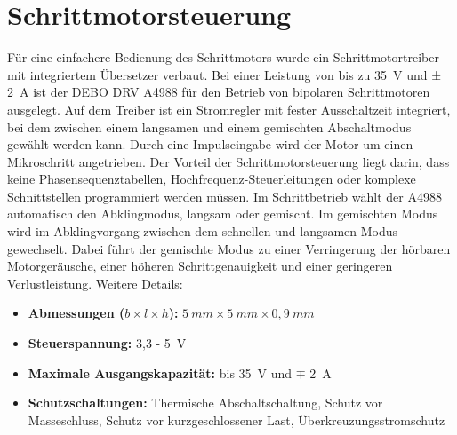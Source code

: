 \section{Schrittmotorsteuerung}	

Für eine einfachere Bedienung des Schrittmotors wurde ein Schrittmotortreiber mit integriertem Übersetzer verbaut. Bei einer Leistung von bis zu 35\ V und ± 2\ A ist der DEBO DRV A4988 für den Betrieb von bipolaren Schrittmotoren ausgelegt. Auf dem Treiber ist ein Stromregler mit fester Ausschaltzeit integriert, bei dem zwischen einem langsamen und einem gemischten Abschaltmodus gewählt werden kann. Durch eine Impulseingabe wird der Motor um einen Mikroschritt angetrieben. Der Vorteil der Schrittmotorsteuerung liegt darin, dass keine Phasensequenztabellen, Hochfrequenz-Steuerleitungen oder komplexe Schnittstellen programmiert werden müssen. Im Schrittbetrieb wählt der A4988 automatisch den Abklingmodus, langsam oder gemischt. Im gemischten Modus wird im Abklingvorgang zwischen dem schnellen und langsamen Modus gewechselt. Dabei führt der gemischte Modus zu einer Verringerung der hörbaren Motorgeräusche, einer höheren Schrittgenauigkeit und einer geringeren Verlustleistung.  
Weitere Details: \begin{itemize}
	\item \textbf{Abmessungen ($b \times l \times h$):} $5 \ mm \times 5 \ mm \times 0,9 \ mm$
	\item \textbf{Steuerspannung:} 3,3 - 5\ V
	\item \textbf{Maximale Ausgangskapazität:} bis 35\ V und $\mp$ 2\ A
	\item \textbf{Schutzschaltungen:}  Thermische Abschaltschaltung, Schutz vor Masseschluss, Schutz vor kurzgeschlossener Last, Überkreuzungsstromschutz
\cite{Allegro.2022}
\end{itemize}




